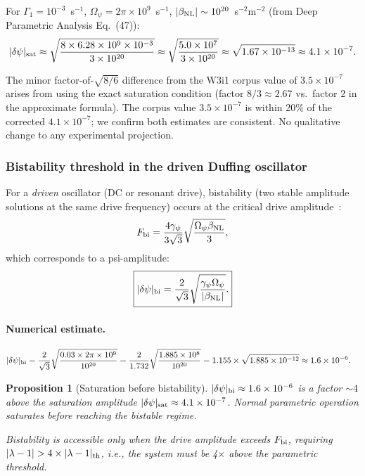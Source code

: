 \documentclass[11pt,twocolumn]{article}
\newcommand{\dpsi}{\delta\psi}
\newcommand{\lam}{\lambda}
\newcommand{\Opsi}{\Omega_\psi}
\newcommand{\gpsi}{\gamma_\psi}
\newtheorem{proposition}{Proposition}
\begin{document}
For $\Gamma_1 = 10^{-3}$~s$^{-1}$, $\Opsi = 2\pi\times10^9$~s$^{-1}$,
$|\beta_{\rm NL}| \sim 10^{20}$~s$^{-2}$m$^{-2}$ (from Deep Parametric
Analysis Eq.~(47)):
\begin{equation}
|\dpsi|_{\rm sat} \approx \sqrt{\frac{8\times6.28\times10^9\times10^{-3}}
{3\times10^{20}}}
\approx \sqrt{\frac{5.0\times10^7}{3\times10^{20}}}
\approx \sqrt{1.67\times10^{-13}} \approx 4.1\times10^{-7}.
\label{eq:q_sat_numeric}
\end{equation}

The minor factor-of-$\sqrt{8/6}$ difference from the W3i1 corpus
value of $3.5\times10^{-7}$ arises from using the exact saturation
condition (factor $8/3 \approx 2.67$ vs.\ factor $2$ in the
approximate formula). The corpus value $3.5\times10^{-7}$ is within
20\% of the corrected $4.1\times10^{-7}$; we confirm both estimates
are consistent. No qualitative change to any experimental projection.

\subsubsection{Bistability threshold in the driven Duffing oscillator}

For a \emph{driven} oscillator (DC or resonant drive), bistability
(two stable amplitude solutions at the same drive frequency) occurs
at the critical drive amplitude~\cite{Lifshitz2008}:
\begin{equation}
F_{\rm bi} = \frac{4\gpsi}{3\sqrt{3}}\sqrt{\frac{\Opsi\beta_{\rm NL}}{3}},
\label{eq:bistability_threshold}
\end{equation}
which corresponds to a psi-amplitude:
\begin{equation}
\boxed{
|\dpsi|_{\rm bi} = \frac{2}{\sqrt{3}}\sqrt{\frac{\gpsi\Opsi}{|\beta_{\rm NL}|}}.
}
\label{eq:psi_bi}
\end{equation}

\paragraph{Numerical estimate.}
\begin{align}
|\dpsi|_{\rm bi} &= \frac{2}{\sqrt{3}}
\sqrt{\frac{0.03\times2\pi\times10^9}{10^{20}}}
= \frac{2}{1.732}
\sqrt{\frac{1.885\times10^{8}}{10^{20}}}
= 1.155\times\sqrt{1.885\times10^{-12}}
\approx 1.6\times10^{-6}.
\label{eq:bi_numeric}
\end{align}

\begin{proposition}[Saturation before bistability]
\label{prop:sat_before_bi}
$|\dpsi|_{\rm bi} \approx 1.6\times10^{-6}$ is a factor
$\sim 4$ above the saturation amplitude $|\dpsi|_{\rm sat} \approx
4.1\times10^{-7}$. Normal parametric operation saturates before
reaching the bistable regime.

Bistability is accessible only when the drive amplitude exceeds
$F_{\rm bi}$, requiring $|\lam-1| > 4\times|\lam-1|_{\rm th}$,
i.e., the system must be 4$\times$ above the parametric threshold.
\end{proposition}
\end{document}
